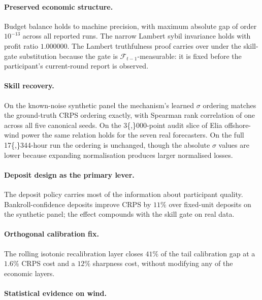\documentclass[
  11pt,
  a4paper,
  oneside]{report}
\begin{document}
\paragraph{Preserved economic structure.}

Budget balance holds to machine precision, with maximum absolute gap of
order \(10^{-13}\) across all reported runs. The narrow Lambert sybil
invariance holds with profit ratio \(1.000000\). The Lambert
truthfulness proof carries over under the skill-gate substitution
because the gate is \(\mathcal{F}_{t-1}\)-measurable: it is fixed before
the participant's current-round report is observed.

\paragraph{Skill recovery.}

On the known-noise synthetic panel the mechanism's learned \(\sigma\)
ordering matches the ground-truth CRPS ordering exactly, with Spearman
rank correlation of one across all five canonical seeds. On the
3\{,\}000-point audit slice of Elia offshore-wind power the same
relation holds for the seven real forecasters. On the full
17\{,\}344-hour run the ordering is unchanged, though the absolute
\(\sigma\) values are lower because expanding normalisation produces
larger normalised losses.

\paragraph{Deposit design as the primary lever.}

The deposit policy carries most of the information about participant
quality. Bankroll-confidence deposits improve CRPS by \(11\%\) over
fixed-unit deposits on the synthetic panel; the effect compounds with
the skill gate on real data.

\paragraph{Orthogonal calibration fix.}

The rolling isotonic recalibration layer closes \(41\%\) of the tail
calibration gap at a \(1.6\%\) CRPS cost and a \(12\%\) sharpness cost,
without modifying any of the economic layers.

\paragraph{Statistical evidence on wind.}
\end{document}
